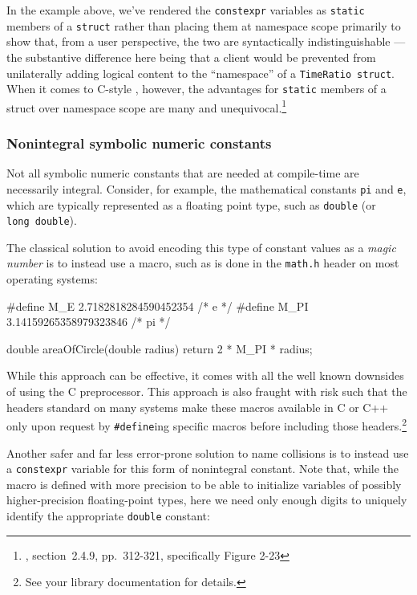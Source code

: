 \noindent In the example above, we've rendered the \lstinline!constexpr! variables as
\lstinline!static! members of a \lstinline!struct! rather than placing them at
namespace scope primarily to show that, from a user perspective, the two
are syntactically indistinguishable --- the substantive difference here
being that a client would be prevented from unilaterally adding logical
content to the ``namespace'' of a \lstinline!TimeRatio!~\lstinline!struct!.
When it comes to C-style , however, the
advantages for \lstinline!static! members of a struct over namespace scope
are many and \mbox{unequivocal}.{\cprotect\footnote{\cite{lakos20}, section~2.4.9, pp.~312-321, specifically Figure 2-23}}

\subsubsection[Nonintegral symbolic numeric constants]{Nonintegral symbolic numeric constants}\label{non-integral-symbolic-numeric-constants}

Not all symbolic numeric constants that are needed at compile-time are
necessarily integral. Consider, for example, the mathematical constants
\lstinline!pi! and \lstinline!e!, which are typically represented as a
floating point type, such as \lstinline!double! (or
\lstinline!long!~\lstinline!double!).

The classical solution to avoid encoding this type of constant values as
a \emph{magic number} is to instead use a macro, such as is done in the
\lstinline!math.h! header on most operating systems:

\begin{emcppslisting}
#define M_E   2.7182818284590452354  /* e */
#define M_PI  3.14159265358979323846 /* pi */

double areaOfCircle(double radius)
{
    return 2 * M_PI * radius;
}
\end{emcppslisting}
    
\noindent While this approach can be effective, it comes with all the well known
downsides of using the C preprocessor. This approach is also fraught
with risk such that the headers standard on many systems make these
macros available in C or C++ only upon request by \lstinline!#define!ing
specific macros before including those headers.\footnote{See your library
documentation for details.}

Another safer and far less error-prone solution to name collisions is to
instead use a \lstinline!constexpr! variable for this form of nonintegral
constant. Note that, while the macro is defined with more precision to
be able to initialize variables of possibly higher-precision
floating-point types, here we need only enough digits to uniquely
identify the appropriate \lstinline!double! constant:

